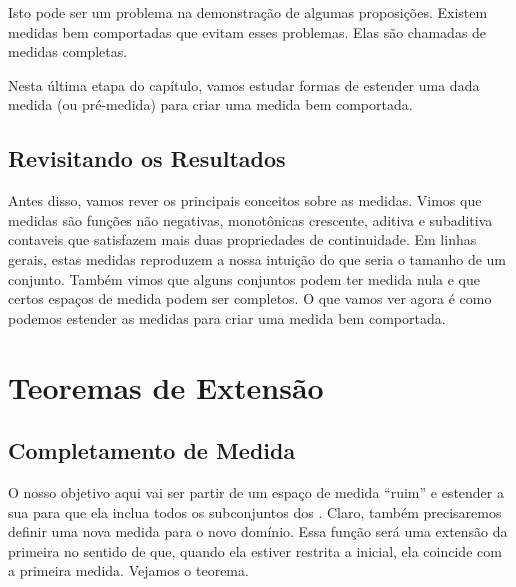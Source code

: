 \almostEverywhere

\subsetsMayNotBeMeasurable

Isto pode ser um problema na demonstração de algumas proposições. Existem medidas bem comportadas que evitam esses problemas. Elas são chamadas de medidas completas.

\completeMeasureSpace

Nesta última etapa do capítulo, vamos estudar formas de estender uma dada medida (ou pré-medida) para criar uma medida bem comportada.

\subsection*{Revisitando os Resultados}
Antes disso, vamos rever os principais conceitos sobre as medidas. Vimos que medidas são funções não negativas, monotônicas crescente, aditiva e subaditiva contaveis que satisfazem mais duas propriedades de continuidade. Em linhas gerais, estas medidas reproduzem a nossa intuição do que seria o tamanho de um conjunto. Também vimos que alguns conjuntos podem ter medida nula e que certos espaços de medida podem ser completos. O que vamos ver agora é como podemos estender as medidas para criar uma medida bem comportada.













\section{Teoremas de Extensão}
\subsection*{Completamento de Medida}
O nosso objetivo aqui vai ser partir de um espaço de medida ``ruim'' e estender a sua \sigmaAlg para que ela inclua todos os subconjuntos dos . Claro, também precisaremos definir uma nova medida para o novo domínio. Essa função será uma extensão da primeira no sentido de que, quando ela estiver restrita a \sigmaAlg inicial, ela coincide com a primeira medida. Vejamos o teorema.

